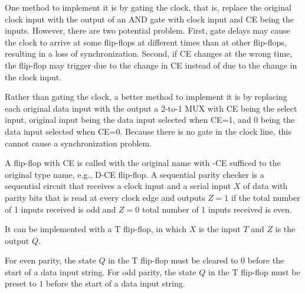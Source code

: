 \documentclass[a4paper,12pt]{report}
\begin{document}
One method to implement it is by gating the clock, that is, replace the original clock input with the output of an AND gate with clock input and CE being the inputs. However, there are two potential problem. First, gate delays may cause the clock to arrive at some flip-flops at different times than at other flip-flops, resulting in a loss of synchronization. Second, if CE changes at the wrong time, the flip-flop may trigger due to the change in CE instead of due to the change in the clock input.

Rather than gating the clock, a better method to implement it is by replacing each original data input with the output a 2-to-1 MUX with CE being the select input, original input being the data input selected when CE=1, and 0 being the data input selected when CE=0. Because there is no gate in the clock line, this cannot cause a synchronization problem.

A flip-flop with CE is called with the original name with -CE sufficed to the original type name, e.g., D-CE flip-flop.
A sequential parity checker is a sequential circuit that receives a clock input and a serial input $X$ of data with parity bits that is read at every clock edge and outputs $Z=1$ if the total number of 1 inputs received is odd and $Z=0$ total number of 1 inputs received is even.

It can be implemented with a T flip-flop, in which $X$ is the input $T$ and $Z$ is the output $Q$.

For even parity, the state $Q$ in the T flip-flop must be cleared to $0$ before the start of a data input string. For odd parity, the state $Q$ in the T flip-flop must be preset to $1$ before the start of a data input string.
\end{document}
